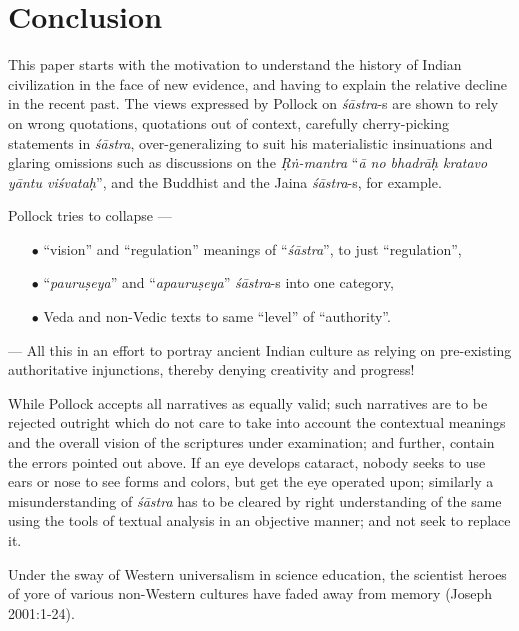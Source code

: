 \section{Conclusion}\label{art12-sec4}

This paper starts with the motivation to understand the history of Indian civilization in the face of new evidence, and having to explain the relative decline in the recent past. The views expressed by Pollock on {\sl śāstra}-s are shown to rely on wrong quotations, quotations out of context, carefully cherry-picking statements in {\sl śāstra}, over-generalizing to suit his materialistic insinuations and glaring omissions such as discussions on the {\sl Ṛṅ-mantra} ``{\sl ā no bhadrāḥ kratavo yāntu viśvataḥ}'', and the Buddhist and the Jaina {\sl śāstra}-s, for example.

Pollock tries to collapse ---
\begin{itemize}
\itemsep=1pt
\item[$\bullet$]  ``vision'' and ``regulation'' meanings of ``{\sl śāstra}'', to just ``regulation'',

\item[$\bullet$] ``{\sl pauruṣeya}'' and ``{\sl apauruṣeya}'' {\sl śāstra}-s into one category,

\item[$\bullet$] Veda and non-Vedic texts to same ``level'' of ``authority''.
\end{itemize}
--- All this in an effort to portray ancient Indian culture as relying on pre-existing authoritative injunctions, thereby denying creativity and progress!

While Pollock accepts all narratives as equally valid; such narratives are to be rejected outright which do not care to take into account the contextual meanings and the overall vision of the scriptures under examination; and further, contain the errors pointed out above. If an eye develops cataract, nobody seeks to use ears or nose to see forms and colors, but get the eye operated upon; similarly a misunderstanding of {\sl śāstra} has to be cleared by right understanding of the same using the tools of textual analysis in an objective manner; and not seek to replace it. 

Under the sway of Western universalism in science education, the scientist heroes of yore of various non-Western cultures have faded away from memory (Joseph 2001:1-24). 

